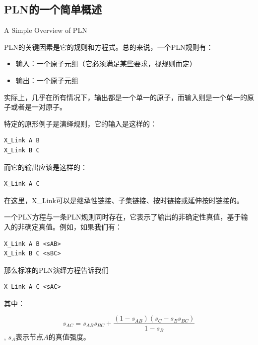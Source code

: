 \subsection{PLN的一个简单概述}{A Simple Overview of PLN}

PLN的关键因素是它的规则和方程式。总的来说，一个PLN规则有：

\begin{itemize}
\item 输入：一个原子元组（它必须满足某些要求，视规则而定）
\item 输出：一个原子元组
\end{itemize}

实际上，几乎在所有情况下，输出都是一个单一的原子，而输入则是一个单一的原子或者是一对原子。

特定的原形例子是演绎规则，它的输入是这样的：

{\tt\begin{small}\begin{lstlisting}
X_Link A B
X_Link B C
\end{lstlisting}\end{small}}

而它的输出应该是这样的：

{\tt\begin{small}\begin{lstlisting}
X_Link A C
\end{lstlisting}\end{small}}

在这里，X\_Link可以是继承性链接、子集链接、按时链接或延伸按时链接的。

一个PLN方程与一条PLN规则同时存在，它表示了输出的非确定性真值，基于输入的非确定真值。例如，如果我们有：

{\tt\begin{small}\begin{lstlisting}
X_Link A B <sAB>
X_Link B C <sBC>
\end{lstlisting}\end{small}}



那么标准的PLN演绎方程告诉我们

{\tt\begin{small}\begin{lstlisting}
X_Link A C <sAC>
\end{lstlisting}\end{small}}

其中： 

$$
s_{AC}=s_{AB}s_{BC}+\frac{\left(1-s_{AB}\right)\left(s_C-s_Bs_{BC}\right)}{1-s_B}
$$, $s_A$表示节点$A$的真值强度。

